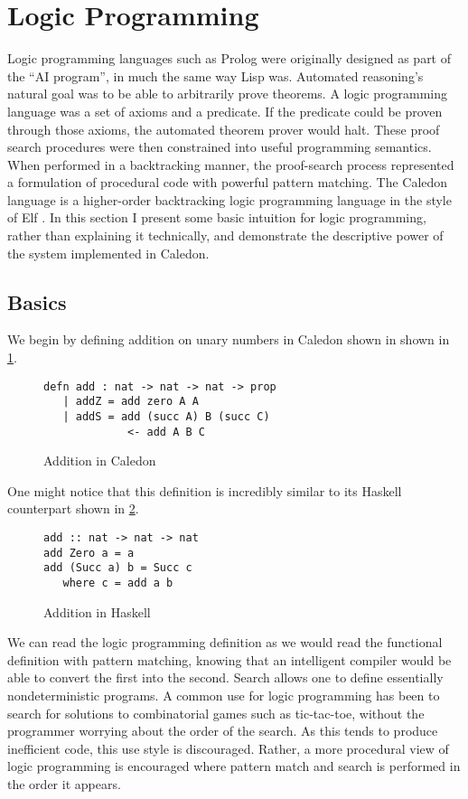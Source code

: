 \section{Logic Programming}

Logic programming languages such as Prolog were originally designed as part of the ``AI
program'', in much the same way Lisp was. Automated reasoning’s natural goal was
to be able to arbitrarily prove theorems. A logic programming language was a 
set of axioms and a predicate. If the predicate could be proven through those axioms,
the automated theorem prover would halt.  These proof search procedures were
then constrained into useful programming semantics. When performed in a backtracking
manner, the proof-search process represented a formulation of procedural code
with powerful pattern matching. The Caledon language is a higher-order backtracking
logic programming language in the style of Elf \citep{pfenning1991logic}. In this section I present some basic
intuition for logic programming, rather than explaining it technically, and demonstrate the 
descriptive power of the system implemented in Caledon.

\FloatBarrier
\subsection{Basics}
We begin by defining addition on unary numbers in Caledon shown in shown in \ref{code:add}.

\begin{figure}[H]
\begin{lstlisting}
defn add : nat -> nat -> nat -> prop
   | addZ = add zero A A
   | addS = add (succ A) B (succ C) 
             <- add A B C
\end{lstlisting}
\caption{Addition in Caledon}
\label{code:add}
\end{figure}

One might notice that this definition is incredibly similar to its Haskell counterpart shown in \ref{code:hask}.

\begin{figure}[H]
\begin{lstlisting}
add :: nat -> nat -> nat
add Zero a = a
add (Succ a) b = Succ c
   where c = add a b
\end{lstlisting}
\caption{Addition in Haskell}
\label{code:hask}
\end{figure}

We can read the logic programming definition as we would read the functional definition with pattern
matching, knowing that an intelligent compiler would be able to convert the first into the second.  
Search allows one to define essentially nondeterministic programs. A common use for
logic programming has been to search for solutions to combinatorial games such as tic-tac-toe, 
without the programmer worrying about the order of the search. As this tends
to produce inefficient code, this use style is discouraged. Rather, a more procedural view of logic programming is encouraged where pattern match and search is performed
in the order it appears.

